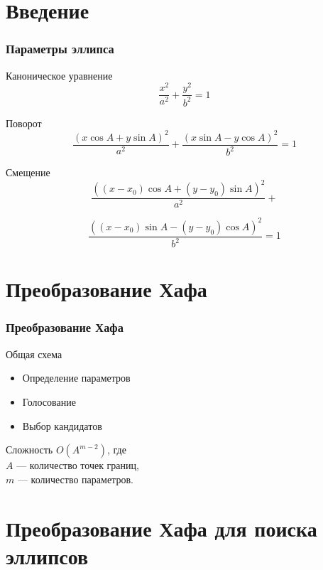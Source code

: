 \documentclass[14pt]{beamer}
\begin{document}
\section{Введение}
\begin{frame}
\frametitle{Параметры эллипса}
\small
\begin{block}{Каноническое уравнение}
$$ \frac{x^2}{a^2} + \frac{y^2}{b^2} = 1 $$
\end{block}

\begin{block}{Поворот}
$$ \frac{(x\cos A + y\sin A)^2}{a^2} + \frac{(x\sin A - y\cos A)^2}{b^2} = 1 $$
\end{block}

\begin{block}{Смещение}
  $$ \frac{((x - x_0)\cos A + (y - y_0)\sin A)^2}{a^2}  + $$
  
  $$ \frac{((x - x_0)\sin A - (y - y_0)\cos A)^2}{b^2} = 1 $$
\end{block}
\normalsize
\end{frame}

\section{Преобразование Хафа}
\begin{frame}
\frametitle{Преобразование Хафа}
\begin{block}{Общая схема}
\begin{itemize}
  \item Определение параметров
  \item Голосование
  \item Выбор кандидатов   
\end{itemize}
\end{block}

\begin{block}{Сложность}
\(O(A^{m-2})\), где \\\(A\) --- количество точек границ, \\\(m\) --- количество параметров.
\end{block}
\end{frame}

\section{Преобразование Хафа для поиска эллипсов}
\end{document}
